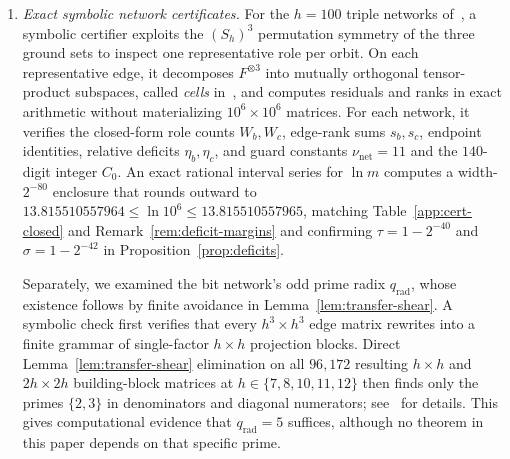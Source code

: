 \begin{enumerate}[label=(\arabic*),leftmargin=*,itemsep=2pt]
\item \emph{Exact symbolic network certificates.} For the $h=100$ triple networks of~\cite[\S3]{OAI26}, a symbolic certifier exploits the $(S_h)^3$ permutation symmetry of the three ground sets to inspect one representative role per orbit. On each representative edge, it decomposes $F^{\otimes 3}$ into mutually orthogonal tensor-product subspaces, called \emph{cells} in~\cite{Code26}, and computes residuals and ranks in exact arithmetic without materializing $10^6\times10^6$ matrices. For each network, it verifies the closed-form role counts $W_b,W_c$, edge-rank sums $s_b,s_c$, endpoint identities, relative deficits $\eta_b,\eta_c$, and guard constants $\nu_{\mathrm{net}}=11$ and the $140$-digit integer $C_0$. An exact rational interval series for $\ln m$ computes a width-$2^{-80}$ enclosure that rounds outward to $13.815510557964\le\ln10^6\le13.815510557965$, matching Table~\ref{app:cert-closed} and Remark~\ref{rem:deficit-margins} and confirming $\tau=1-2^{-40}$ and $\sigma=1-2^{-42}$ in Proposition~\ref{prop:deficits}.

Separately, we examined the bit network's odd prime radix $q_{\mathrm{rad}}$, whose existence follows by finite avoidance in Lemma~\ref{lem:transfer-shear}. A symbolic check first verifies that every $h^3\times h^3$ edge matrix rewrites into a finite grammar of single-factor $h\times h$ projection blocks. Direct Lemma~\ref{lem:transfer-shear} elimination on all $96{,}172$ resulting $h\times h$ and $2h\times 2h$ building-block matrices at $h\in\{7,8,10,11,12\}$ then finds only the primes $\{2,3\}$ in denominators and diagonal numerators; see~\cite{Code26} for details. This gives computational evidence that $q_{\mathrm{rad}}=5$ suffices, although no theorem in this paper depends on that specific prime.
\end{enumerate}

